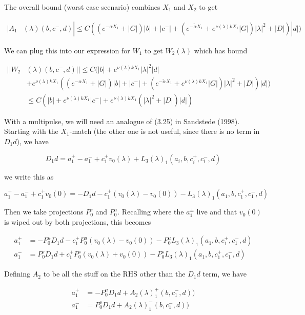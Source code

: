 \documentclass[12pt]{article}
\begin{document}
\begin{enumerate}
The overall bound (worst case scenario) combines $X_1$ and $X_2$ to get

\begin{align*}
|A_1&(\lambda)(b, c^-, d)| \leq C( (e^{-\alpha X_1} + |G|) |b| + |c^-| + (e^{-\tilde{\alpha} X_1} + e^{\nu(\lambda)k X_1} |G|) |\lambda|^2 + |D|) |d| )
\end{align*}

We can plug this into our expression for $W_1$ to get $W_2(\lambda)$ which has bound


\begin{align*}
||W_2&(\lambda)(b,c^-,d)|| \leq C (|b| + e^{\nu(\lambda)k X_1}|\lambda|^2 |d|\\
&+ e^{\nu(\lambda)k X_1} ( (e^{-\alpha X_1} + |G|) |b| + |c^-| + (e^{-\tilde{\alpha} X_1} + e^{\nu(\lambda)k X_1} |G|) |\lambda|^2 + |D|) |d| ) \\
&\leq C( |b| + e^{\nu(\lambda)k X_1} |c^-| +  e^{\nu(\lambda)k X_1}(|\lambda|^2 + |D|) |d| )
\end{align*}

With a multipulse, we will need an analogue of (3.25) in Sandstede (1998). Starting with the $X_1$-match (the other one is not useful, since there is no term in $D_1 d$), we have

\[
D_1 d = a_1^+ - a_1^- + c_1^+ v_0(\lambda) + L_3(\lambda)_1(a_i, b, c_i^+, c_i^-, d)
\]

we write this as

\[
a_1^+ - a_1^- + c_1^+ v_0(0) = -D_1 d - c_1^+ (v_0(\lambda) - v_0(0)) - L_3(\lambda)_1(a_1, b, c_1^+, c_1^-, d)
\]

Then we take projections $P^s_0$ and $P^u_0$. Recalling where the $a_1^\pm$ live and that $v_0(0)$ is wiped out by both projections, this becomes 

\begin{align*}
a_1^+ &= -P^u_0 D_1 d - c_1^+ P^u_0 (v_0(\lambda) - v_0(0)) - P^u_0 L_3(\lambda)_1(a_1, b, c_1^+, c_1^-, d) \\
a_1^- &=  P^s_0 D_1 d + c_1^+ P^s_0 (v_0(\lambda) + v_0(0)) - P^s_0 L_3(\lambda)_1(a_1, b, c_1^+, c_1^-, d)
\end{align*}

Defining $A_2$ to be all the stuff on the RHS other than the $D_1 d$ term, we have

\begin{align*}
a_1^+ &= -P^u_0 D_1 d + A_2(\lambda)_1^+(b, c_1^-, d))\\
a_1^- &=  P^s_0 D_1 d + A_2(\lambda)_1^-(b, c_1^-, d))
\end{align*}


\end{enumerate}
\end{document}
